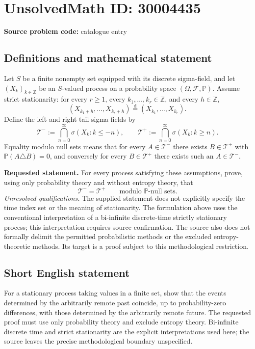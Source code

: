\documentclass[11pt]{article}
\newcommand{\Z}{\mathbb{Z}}
\begin{document}
\section*{UnsolvedMath ID: 30004435}
\textbf{Source problem code:} catalogue entry
\subsection{Definitions and mathematical statement}
Let \(S\) be a finite nonempty set equipped with its discrete sigma-field, and let \((X_k)_{k\in\Z}\) be an \(S\)-valued process on a probability space \((\Omega,\mathcal F,\mathbb P)\). Assume strict stationarity: for every \(r\geq1\), every \(k_1,\ldots,k_r\in\Z\), and every \(h\in\Z\),
\[
(X_{k_1+h},\ldots,X_{k_r+h})\overset{\mathrm d}= (X_{k_1},\ldots,X_{k_r}).
\]
Define the left and right tail sigma-fields by
\[
\mathcal T^-:=\bigcap_{n=0}^{\infty}\sigma(X_k:k\leq -n),
\qquad
\mathcal T^+:=\bigcap_{n=0}^{\infty}\sigma(X_k:k\geq n).
\]
Equality modulo null sets means that for every \(A\in\mathcal T^-\) there exists \(B\in\mathcal T^+\) with \(\mathbb P(A\triangle B)=0\), and conversely for every \(B\in\mathcal T^+\) there exists such an \(A\in\mathcal T^-\).

\textbf{Requested statement.} For every process satisfying these assumptions, prove, using only probability theory and without entropy theory, that
\[
\mathcal T^-=\mathcal T^+\qquad\text{modulo }\mathbb P\text{-null sets}.
\]
\textit{Unresolved qualifications.} The supplied statement does not explicitly specify the time index set or the meaning of stationarity. The formulation above uses the conventional interpretation of a bi-infinite discrete-time strictly stationary process; this interpretation requires source confirmation. The source also does not formally delimit the permitted probabilistic methods or the excluded entropy-theoretic methods. Its target is a proof subject to this methodological restriction.
\subsection{Short English statement}
For a stationary process taking values in a finite set, show that the events determined by the arbitrarily remote past coincide, up to probability-zero differences, with those determined by the arbitrarily remote future. The requested proof must use only probability theory and exclude entropy theory. Bi-infinite discrete time and strict stationarity are the explicit interpretations used here; the source leaves the precise methodological boundary unspecified.
\end{document}

